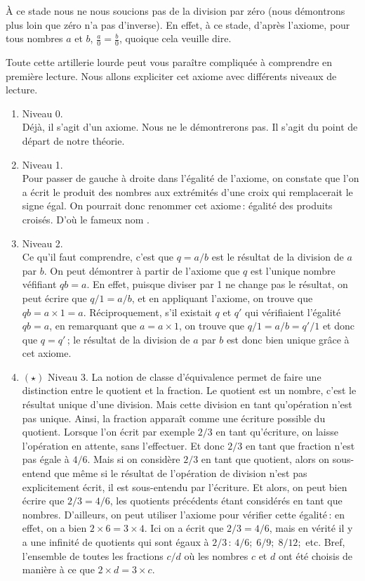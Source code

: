 		\begin{rema}
			À ce stade nous ne nous soucions pas de la division par zéro (nous démontrons plus loin que zéro n'a pas d'inverse). En effet, à ce stade, d'après l'axiome, pour tous nombres $a$ et $b$, $\frac{a}{0}=\frac{b}{0}$, quoique cela veuille dire.
		\end{rema}

		Toute cette artillerie lourde peut vous paraître compliquée à comprendre en première lecture. Nous allons expliciter cet axiome avec différents niveaux de lecture.
		\begin{enumerate}
			\item Niveau 0. \\ Déjà, il s'agit d'un axiome. Nous ne le démontrerons pas. Il s'agit du point de départ de notre théorie. 
			\item Niveau 1. \\ Pour passer de gauche à droite dans l'égalité de l'axiome, on constate que l'on a écrit le produit des nombres aux extrémités d'une croix qui remplacerait le signe égal. On pourrait donc renommer cet axiome\,: égalité des produits croisés. D'où le fameux nom .
			\item Niveau 2. \\ Ce qu'il faut comprendre, c'est que $q=a/b$ est le résultat de la division de $a$ par $b$. On peut démontrer à partir de l'axiome que $q$ est l'unique nombre véfifiant $qb=a$. En effet, puisque diviser par 1 ne change pas le résultat, on peut écrire que $q/1=a/b$, et en appliquant l'axiome, on trouve que $qb=a\times1=a$. Réciproquement, s'il existait $q$ et $q'$ qui vérifiaient l'égalité $qb=a$, en remarquant que $a=a\times 1$, on trouve que $q/1=a/b=q'/1$ et donc que $q=q'$\,; le résultat de la division de $a$ par $b$ est donc bien unique grâce à cet axiome.
			\item $(\star)$ Niveau 3. La notion de classe d'équivalence permet de faire une distinction entre le quotient et la fraction. Le quotient est un nombre, c'est le résultat unique d'une division. Mais cette division en tant qu'opération n'est pas unique. Ainsi, la fraction apparaît comme une écriture possible du quotient. Lorsque l'on écrit par exemple $2/3$ en tant qu'écriture, on laisse l'opération en attente, sans l'effectuer. Et donc $2/3$ en tant que fraction n'est pas égale à $4/6$. Mais si on considère $2/3$ en tant que quotient, alors on sous-entend que même si le résultat de l'opération de division n'est pas explicitement écrit, il est sous-entendu par l'écriture. Et alors, on peut bien écrire que $2/3=4/6$, les quotients précédents étant considérés en tant que nombres. D'ailleurs, on peut utiliser l'axiome pour vérifier cette égalité\,: en effet, on a bien $2\times6=3\times4$. Ici on a écrit que $2/3=4/6$, mais en vérité il y a une infinité de quotients qui sont égaux à $2/3$\,: $4/6;\;6/9;\;8/12;$ etc. Bref, l'ensemble de toutes les fractions $c/d$ où les nombres $c$ et $d$ ont été choisis de manière à ce que $2\times d=3\times c$.  
		\end{enumerate}

